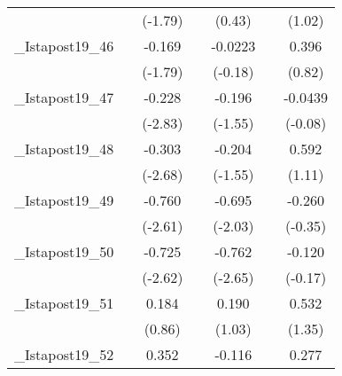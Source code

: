 {\begin{tabular}{l*{6}{c}}
            &                     &     (-1.79)         &                     &      (0.43)         &                     &      (1.02)         \\
[1em]
\_Istapost19\_46&                     &      -0.169         &                     &     -0.0223         &                     &       0.396         \\
            &                     &     (-1.79)         &                     &     (-0.18)         &                     &      (0.82)         \\
[1em]
\_Istapost19\_47&                     &      -0.228\sym{**} &                     &      -0.196         &                     &     -0.0439         \\
            &                     &     (-2.83)         &                     &     (-1.55)         &                     &     (-0.08)         \\
[1em]
\_Istapost19\_48&                     &      -0.303\sym{*}  &                     &      -0.204         &                     &       0.592         \\
            &                     &     (-2.68)         &                     &     (-1.55)         &                     &      (1.11)         \\
[1em]
\_Istapost19\_49&                     &      -0.760\sym{*}  &                     &      -0.695         &                     &      -0.260         \\
            &                     &     (-2.61)         &                     &     (-2.03)         &                     &     (-0.35)         \\
[1em]
\_Istapost19\_50&                     &      -0.725\sym{*}  &                     &      -0.762\sym{*}  &                     &      -0.120         \\
            &                     &     (-2.62)         &                     &     (-2.65)         &                     &     (-0.17)         \\
[1em]
\_Istapost19\_51&                     &       0.184         &                     &       0.190         &                     &       0.532         \\
            &                     &      (0.86)         &                     &      (1.03)         &                     &      (1.35)         \\
[1em]
\_Istapost19\_52&                     &       0.352         &                     &      -0.116         &                     &       0.277         \\

\end{tabular}}

